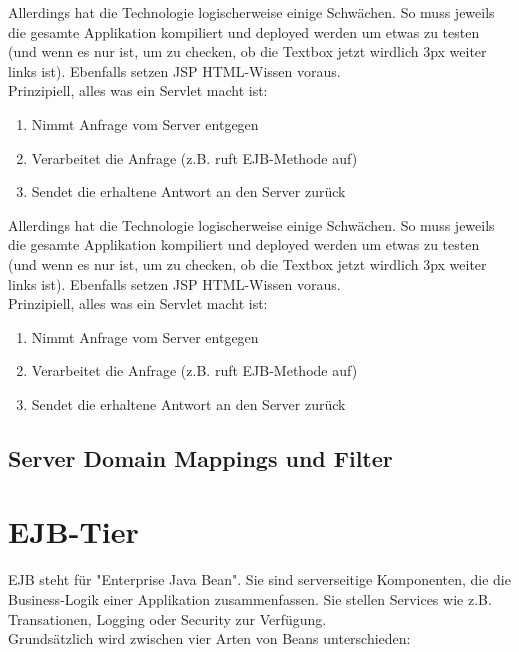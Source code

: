 \documentclass[a4paper, 11pt]{article}
\begin{document}
Allerdings hat die Technologie logischerweise einige Schwächen. So muss jeweils die gesamte Applikation kompiliert und deployed werden um etwas zu testen (und wenn es nur ist, um zu checken, ob die Textbox jetzt wirdlich 3px weiter links ist). Ebenfalls setzen JSP HTML-Wissen voraus. \\

Prinzipiell, alles was ein Servlet macht ist:

\begin{enumerate}
    \item Nimmt Anfrage vom Server entgegen
    \item Verarbeitet die Anfrage (z.B. ruft EJB-Methode auf)
    \item Sendet die erhaltene Antwort an den Server zurück
\end{enumerate}

Allerdings hat die Technologie logischerweise einige Schwächen. So muss jeweils die gesamte Applikation kompiliert und deployed werden um etwas zu testen (und wenn es nur ist, um zu checken, ob die Textbox jetzt wirdlich 3px weiter links ist). Ebenfalls setzen JSP HTML-Wissen voraus. \\

Prinzipiell, alles was ein Servlet macht ist:

\begin{enumerate}
    \item Nimmt Anfrage vom Server entgegen
    \item Verarbeitet die Anfrage (z.B. ruft EJB-Methode auf)
    \item Sendet die erhaltene Antwort an den Server zurück
\end{enumerate}

\subsection{Server Domain Mappings und Filter}


\section{EJB-Tier}

EJB steht für "Enterprise Java Bean". Sie sind serverseitige Komponenten, die die Business-Logik einer Applikation zusammenfassen. Sie  stellen Services wie z.B. Transationen, Logging oder Security zur Verfügung. \\
Grundsätzlich wird zwischen vier Arten von Beans unterschieden:
\end{document}
